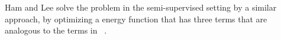 \documentclass[12pt]{article} %
\begin{document}
Ham and Lee \cite{Ham2005a} solve the problem in the semi-supervised setting by a similar approach, by optimizing a energy function that has three terms that are analogous to the terms in ~\cite{Zhai2010}.

\end{document}
